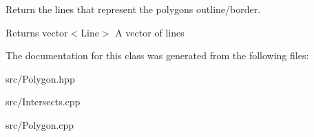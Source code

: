 Return the lines that represent the polygon\textquotesingle{}s outline/border. 

\begin{DoxyReturn}{Returns}
vector$<$\+Line$>$ A vector of lines 
\end{DoxyReturn}


The documentation for this class was generated from the following files\+:\begin{DoxyCompactItemize}
\item 
src/Polygon.\+hpp\item 
src/Intersects.\+cpp\item 
src/Polygon.\+cpp\end{DoxyCompactItemize}
